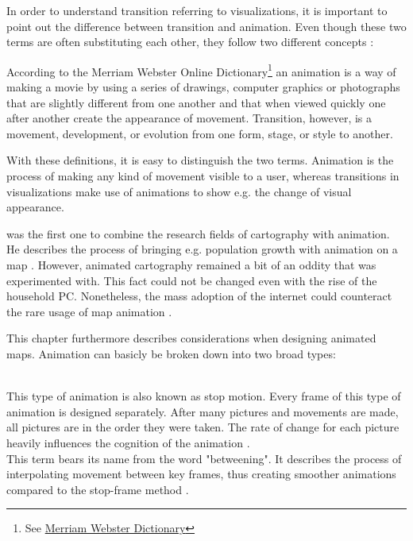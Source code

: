 In order to understand transition referring to visualizations, it is important to point out the difference between transition and animation. Even though these two terms are often substituting each other, they follow two different concepts :

According to the Merriam Webster Online Dictionary\footnote{See \href{http://www.merriam-webster.com/}{Merriam Webster Dictionary}} an animation is a way of making a movie by using a series of drawings, computer graphics or photographs that are slightly different from one another and that when viewed quickly one after another create the appearance of movement. Transition, however, is a movement, development, or evolution from one form, stage, or style to another.

With these definitions, it is easy to distinguish the two terms. Animation is the process of making any kind of movement visible to a user, whereas transitions in visualizations make use of animations to show e.g. the change of visual appearance.

\citeauthor{Thrower1959} was the first one to combine the research fields of cartography with animation. He describes the process of bringing e.g. population growth with animation on a map . However, animated cartography remained a bit of an oddity that was experimented with. This fact could not be changed even with the rise of the household \ac{PC}. Nonetheless, the mass adoption of the internet could counteract the rare usage of map animation .

This chapter furthermore describes considerations when designing animated maps. Animation can basicly be broken down into two broad types:

\begin{enumerate}
 \hfill \\
This type of animation is also known as stop motion. Every frame of this type of animation is designed separately. After many pictures and movements are made, all pictures are in the order they were taken. The rate of change for each picture heavily influences the cognition of the animation .
 \hfill \\
This term bears its name from the word "betweening". It describes the process of interpolating movement between key frames, thus creating smoother animations compared to the stop-frame method .
\end{enumerate}

